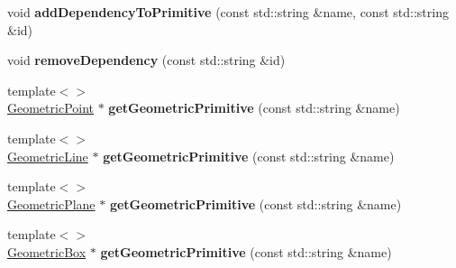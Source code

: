 \begin{DoxyCompactItemize}
\item 
\hypertarget{classhiqp_1_1geometric__primitives_1_1GeometricPrimitiveMap_a493d855058eaf3c15e694a1641abb102}{void {\bfseries add\-Dependency\-To\-Primitive} (const std\-::string \&name, const std\-::string \&id)}\label{classhiqp_1_1geometric__primitives_1_1GeometricPrimitiveMap_a493d855058eaf3c15e694a1641abb102}

\item 
\hypertarget{classhiqp_1_1geometric__primitives_1_1GeometricPrimitiveMap_abab3cf9f15237f9de30a488962b63bf3}{void {\bfseries remove\-Dependency} (const std\-::string \&id)}\label{classhiqp_1_1geometric__primitives_1_1GeometricPrimitiveMap_abab3cf9f15237f9de30a488962b63bf3}

\item 
\hypertarget{classhiqp_1_1geometric__primitives_1_1GeometricPrimitiveMap_a19db1c3b7ebdd46dcf50f5505b60a6bc}{{\footnotesize template$<$$>$ }\\\hyperlink{classhiqp_1_1geometric__primitives_1_1GeometricPoint}{Geometric\-Point} $\ast$ {\bfseries get\-Geometric\-Primitive} (const std\-::string \&name)}\label{classhiqp_1_1geometric__primitives_1_1GeometricPrimitiveMap_a19db1c3b7ebdd46dcf50f5505b60a6bc}

\item 
\hypertarget{classhiqp_1_1geometric__primitives_1_1GeometricPrimitiveMap_ade38cde2dd29b532832c48b47f3f10a8}{{\footnotesize template$<$$>$ }\\\hyperlink{classhiqp_1_1geometric__primitives_1_1GeometricLine}{Geometric\-Line} $\ast$ {\bfseries get\-Geometric\-Primitive} (const std\-::string \&name)}\label{classhiqp_1_1geometric__primitives_1_1GeometricPrimitiveMap_ade38cde2dd29b532832c48b47f3f10a8}

\item 
\hypertarget{classhiqp_1_1geometric__primitives_1_1GeometricPrimitiveMap_a7dc61cfb44db9bba0cdce8729c9269a0}{{\footnotesize template$<$$>$ }\\\hyperlink{classhiqp_1_1geometric__primitives_1_1GeometricPlane}{Geometric\-Plane} $\ast$ {\bfseries get\-Geometric\-Primitive} (const std\-::string \&name)}\label{classhiqp_1_1geometric__primitives_1_1GeometricPrimitiveMap_a7dc61cfb44db9bba0cdce8729c9269a0}

\item 
\hypertarget{classhiqp_1_1geometric__primitives_1_1GeometricPrimitiveMap_a75164f9183ed4e0979cd17300889067f}{{\footnotesize template$<$$>$ }\\\hyperlink{classhiqp_1_1geometric__primitives_1_1GeometricBox}{Geometric\-Box} $\ast$ {\bfseries get\-Geometric\-Primitive} (const std\-::string \&name)}\label{classhiqp_1_1geometric__primitives_1_1GeometricPrimitiveMap_a75164f9183ed4e0979cd17300889067f}


\end{DoxyCompactItemize}
